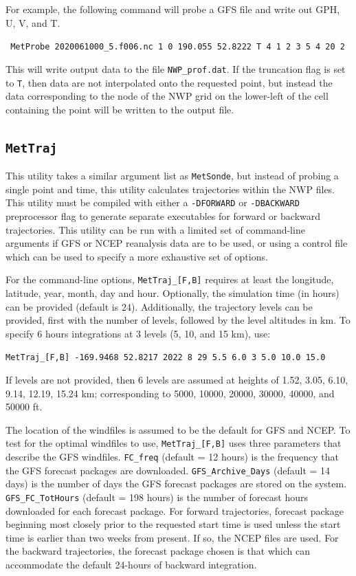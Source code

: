 \documentclass[11pt]{article}   %
\begin{document}
For example, the following command will probe a GFS file and write out
GPH, U, V, and T.

\verb| MetProbe 2020061000_5.f006.nc 1 0 190.055 52.8222 T 4 1 2 3 5 4 20 2 |

This will write output data to the file \texttt{NWP\_prof.dat}.
If the truncation flag is set to \texttt{T}, then data are not interpolated onto
the requested point, but instead the data corresponding to the node of the NWP
grid on the lower-left of the cell containing the point will be written to the output file.

\subsection{\texttt{MetTraj}}

This utility takes a similar argument list as \texttt{MetSonde}, but instead of
probing a single point and time, this utility calculates trajectories within
the NWP files.
This utility must be compiled with either a \texttt{-DFORWARD} or \texttt{-DBACKWARD}
preprocessor flag to generate separate executables for forward or backward trajectories.
This utility can be run with a limited set of command-line arguments if GFS or NCEP
reanalysis data are to be used, or using a control file which can be used to specify
a more exhaustive set of options.

For the command-line options, \texttt{MetTraj\_[F,B]} requires at least the longitude,
latitude, year, month, day and hour.  Optionally, the simulation time (in hours) can
be provided (default is 24).  Additionally, the trajectory levels can be provided,
first with the number of
levels, followed by the level altitudes in km.  To specify 6 hours
integrations at 3 levels (5, 10, and 15 km), use:

\verb|MetTraj_[F,B] -169.9468 52.8217 2022 8 29 5.5 6.0 3 5.0 10.0 15.0 |

If levels are not provided, then 6 levels are assumed at heights of 1.52,
3.05, 6.10, 9.14, 12.19, 15.24 km; corresponding to 5000, 10000, 20000, 30000,
40000, and 50000 ft.

The location of the windfiles is assumed to be the default for GFS and NCEP.
To test for the optimal windfiles to use, \texttt{MetTraj\_[F,B]} uses three
parameters that describe the GFS windfiles.
\texttt{FC\_freq} (default = 12 hours) is the frequency that the GFS forecast
packages are downloaded.  
\texttt{GFS\_Archive\_Days} (default = 14 days) is the number of days the GFS
forecast packages are stored on the system.
\texttt{GFS\_FC\_TotHours} (default = 198 hours) is the number of forecast hours
downloaded for each forecast package.
For forward trajectories, forecast package beginning most closely prior to the requested
start time is used unless the start time is earlier than two weeks from present.  If
so, the NCEP files are used. For the backward trajectories, the forecast package
chosen is that which can accommodate the default 24-hours of backward integration.
\end{document}
